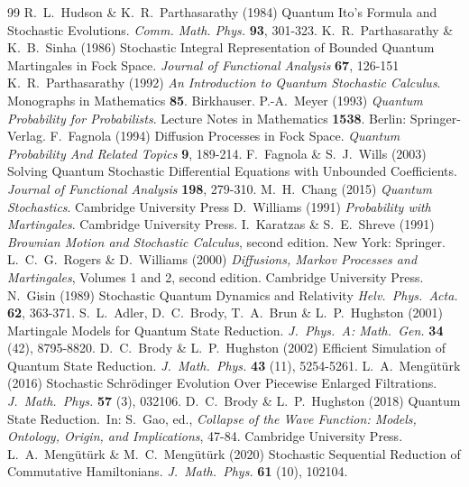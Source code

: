 \documentclass[12pt,a4paper]{article}
\newcommand{\Schrodinger}{{Schr\"odinger }}
\begin{document}
\begin{thebibliography}{99}
%
 R.~L.~Hudson \& K.~R.~Parthasarathy (1984) Quantum Ito's Formula and Stochastic Evolutions. \textit{Comm. Math. Phys.} {\bf 93}, 301-323.
%
 K.~R.~Parthasarathy \& K.~B.~Sinha (1986) Stochastic Integral Representation of Bounded Quantum Martingales in Fock Space. \textit{Journal of Functional Analysis} {\bf 67}, 126-151
%
 K.~R.~Parthasarathy (1992) \textit{An Introduction to Quantum Stochastic Calculus}.  Monographs in Mathematics {\bf 85}. Birkhauser.
%
 P.-A.~Meyer (1993) \textit{Quantum Probability for Probabilists}.  Lecture Notes in Mathematics {\bf 1538}. Berlin: Springer-Verlag.
%
 F.~Fagnola (1994) Diffusion Processes in Fock Space. \textit{Quantum Probability And Related Topics} {\bf 9}, 189-214.
%
 F.~Fagnola \& S.~J.~Wills (2003) Solving Quantum Stochastic Differential Equations with Unbounded Coefficients. \textit{Journal of Functional Analysis} {\bf 198}, 279-310.
%
 M.~H.~Chang (2015) \textit{Quantum Stochastics}. Cambridge University Press
%
 D.~Williams (1991) \textit{Probability with Martingales}. Cambridge University Press.
%
 I.~Karatzas \& S.~E.~Shreve (1991) \textit{Brownian Motion and Stochastic Calculus}, second edition. New York: Springer.
%
 L.~C.~G.~Rogers \& D.~Williams (2000) \textit{Diffusions, Markov Processes and Martingales}, Volumes 1 and 2, second edition. Cambridge University Press.
%
 N.~Gisin (1989) Stochastic Quantum Dynamics and Relativity  \textit{Helv.~Phys.~Acta.} {\bf 62}, 363-371.
%
 S.~L.~Adler, D.~C.~Brody, T.~A.~Brun \& L.~P.~Hughston (2001) Martingale Models for Quantum State Reduction. \textit{J.~Phys.~A: Math.~Gen.} {\bf 34} (42), 8795-8820.
%
 D.~C.~Brody \& L.~P.~Hughston (2002) Efficient Simulation of Quantum State Reduction. \textit{J.~Math.~Phys.} {\bf 43} (11),  5254-5261.
%
 L.~A.~Meng\"ut\"urk (2016) Stochastic \Schrodinger Evolution Over Piecewise Enlarged Filtrations. \textit{J.~Math.~Phys.} {\bf 57} (3), 032106.
%
 D.~C.~Brody \& L.~P.~Hughston (2018) Quantum State Reduction.~In: S.~Gao, ed., \textit{Collapse of the Wave Function: Models, Ontology, Origin, and Implications}, 47-84. Cambridge University Press.
%
 L.~A.~Meng\"ut\"urk \& M.~C.~Meng\"ut\"urk (2020) Stochastic Sequential Reduction of Commutative Hamiltonians. \textit{J.~Math.~Phys.} {\bf 61} (10), 102104.

\end{thebibliography}
\end{document}
